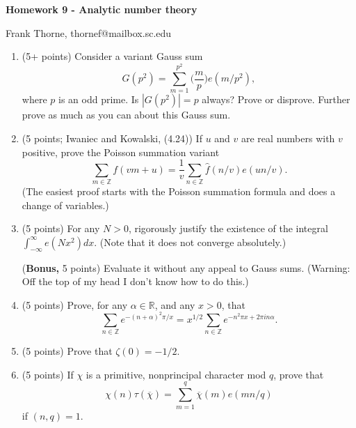\documentclass[12pt]{article}
\begin{document}
\setlength{\topmargin}{-2mm}





\begin{center}{\bf Homework 9 - Analytic number theory}
\end{center}
\begin{center}Frank Thorne, thornef@mailbox.sc.edu
\end{center}
\begin{enumerate}
\item(5+ points)
Consider a variant Gauss sum
\begin{equation}
G(p^2) = \sum_{m = 1}^{p^2} \Big( \frac{m}{p} \Big) e(m/p^2),
\end{equation}
where $p$ is an odd prime. Is $|G(p^2)| = p$ always? Prove or disprove.
Further prove as much as you can about this Gauss sum.

\item (5 points; Iwaniec and Kowalski, (4.24))
If $u$ and $v$ are real numbers with $v$ positive, prove the Poisson summation variant
\begin{equation}
\sum_{m \in \mathbb{Z}} f(vm + u) = \frac{1}{v} \sum_{n \in \mathbb{Z}} \widehat{f}(n/v) e(un/v).
\end{equation}
(The easiest proof starts with the Poisson summation formula and does a change of variables.)

\item (5 points)
For any $N > 0$, rigorously justify the existence of the integral $\int_{- \infty}^{\infty} e(N x^2) dx$.
(Note that it does not converge absolutely.)

({\bf Bonus,} 5 points)
Evaluate it without any appeal to Gauss sums. (Warning: Off the top of my head I don't know how to do this.)

\item (5 points)
Prove, for any $\alpha \in \mathbb{R}$, and any $x > 0$, that
\begin{equation}
\sum_{n \in \mathbb{Z}} e^{-(n + \alpha)^2 \pi /x} = x^{1/2} \sum_{n \in \mathbb{Z}} e^{-n^2 \pi x + 2 \pi i n \alpha}.
\end{equation}

\item (5 points)
Prove that $\zeta(0) = -1/2$.

\item (5 points)
If $\chi$ is a primitive, nonprincipal character mod $q$, prove that
\begin{equation}
\chi(n) \tau(\overline{\chi}) = \sum_{m = 1}^q \overline{\chi}(m) e(mn/q)
\end{equation}
if $(n, q) = 1$.


\end{enumerate}
\end{document}
